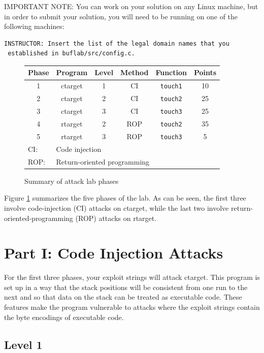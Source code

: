 \documentclass[11pt]{article}
\begin{document}
IMPORTANT NOTE: You can work on your solution on any Linux machine, but 
in order to submit your solution, you will need to be running on one of the 
following machines:
\begin{verbatim}
INSTRUCTOR: Insert the list of the legal domain names that you
 established in buflab/src/config.c.
\end{verbatim}


\begin{figure}
\begin{center}
\begin{tabular}{|c|c|c|c|c|c|}
\hline
Phase & Program & Level & Method & Function & Points \\
\hline
1 & {\sc ctarget} & 1 & CI & \texttt{touch1} & 10 \\
2 & {\sc ctarget} & 2 & CI & \texttt{touch2} & 25 \\
3 & {\sc ctarget} & 3 & CI & \texttt{touch3} & 25 \\
\hline
4 & {\sc rtarget} & 2 & ROP & \texttt{touch2} & 35 \\
5 & {\sc rtarget} & 3 & ROP & \texttt{touch3} & 5 \\
\hline
\multicolumn{1}{l}{CI:} & \multicolumn{4}{l}{Code injection} \\
\multicolumn{1}{l}{ROP:} & \multicolumn{4}{l}{Return-oriented programming} \\
\end{tabular}
\end{center}
\caption{Summary of attack lab phases}
\label{fig:phases}
\end{figure}
Figure \ref{fig:phases} summarizes the five phases of the lab.  As can
be seen, the first three involve code-injection (CI) attacks on {\sc
  ctarget}, while the last two involve return-oriented-programming
(ROP) attacks on {\sc rtarget}.

\section{Part I: Code Injection Attacks}

For the first three phases, your exploit strings will attack {\sc
  ctarget}.  This program is set up in a way that the stack positions
will be consistent from one run to the next and so that data on the
stack can be treated as executable code.  These features make the program
vulnerable to attacks where the exploit strings contain the byte
encodings of executable code.

\subsection{Level 1}
\end{document}

